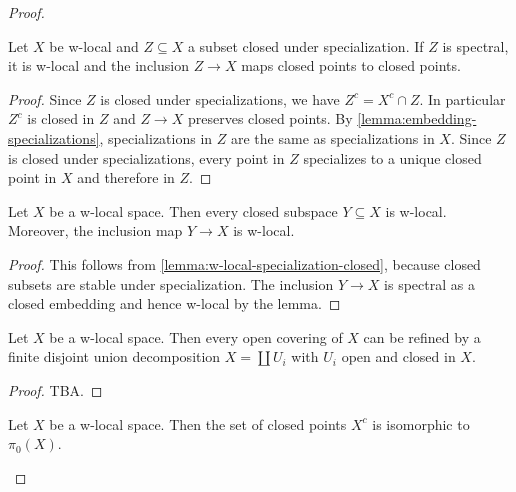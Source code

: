 \begin{proof}
\begin{lemma}
    Let $X$ be w-local and $Z \subseteq X$ a subset closed under specialization. If
    $Z$ is spectral, it is w-local and the inclusion $Z \to X$ maps closed points to closed points.
    \label{lemma:w-local-specialization-closed}
\end{lemma}

\begin{proof}
    Since $Z$ is closed under specializations, we have $Z^c = X^c \cap Z$. In particular
    $Z^c$ is closed in $Z$ and $Z \to X$ preserves closed points.
    By \ref{lemma:embedding-specializations}, specializations
    in $Z$ are the same as specializations in $X$. Since $Z$ is closed
    under specializations, every point in $Z$ specializes to a unique
    closed point in $X$ and therefore in $Z$.
\end{proof}

\begin{lemma}
  \label{thm:closed-subspace-w-local}
  Let \(X\) be a w-local space. Then every closed subspace \(Y \subseteq X\) is w-local.
  Moreover, the inclusion map \(Y \to X\) is w-local.
\end{lemma}

\begin{proof}
    This follows from \ref{lemma:w-local-specialization-closed}, because
    closed subsets are stable under specialization. The inclusion $Y \to X$ is
    spectral as a closed embedding and hence w-local by the lemma.
\end{proof}

\begin{lemma}
    Let $X$ be a w-local space. Then every open covering of $X$ can be refined
    by a finite disjoint union decomposition $X = \coprod U_i$ with $U_i$ open and closed in $X$.
\end{lemma}

\begin{proof}
  TBA.
\end{proof}

\begin{lemma}
  \label{thm:closed-points-isom-pi0}
  Let \(X\) be a w-local space. Then the set of closed points \(X^c\) is isomorphic to \(\pi_0(X)\).
\end{lemma}


\end{proof}
